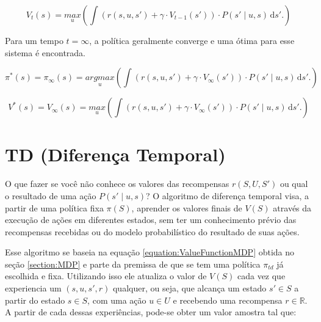 \begin{equation}
    V_t \left( s \right) = \underset{u}{max} \left( \int \! \left( r \left( s, u, s' \right) + \gamma \cdot V_{t-1} \left( s' \right) \right) \cdot P \left( s' \mid u, s \right) \, \mathrm{d}s'. \right)
\end{equation}

Para um tempo $ t = \infty $, a política geralmente converge e uma ótima para esse sistema é encontrada.

\begin{equation}
    \pi^* \left( s \right) = \pi_\infty \left( s \right) = \underset{u}{argmax} \left( \int \! \left( r \left( s, u, s' \right) + \gamma \cdot V_\infty \left( s' \right) \right) \cdot P \left( s' \mid u, s \right) \, \mathrm{d}s'. \right)
\end{equation}

\begin{equation} \label{equation:ValueFunctionMDP}
    V^* \left( s \right) = V_\infty \left( s \right) = \underset{u}{max} \left( \int \! \left( r \left( s, u, s' \right) + \gamma \cdot V_\infty \left( s' \right) \right) \cdot P \left( s' \mid u, s \right) \, \mathrm{d}s'. \right)
\end{equation}


\section{TD (Diferença Temporal)} \label{section:TD}

O que fazer se você não conhece os valores das recompensas $ r \left( S, U, S' \right) $ ou qual o resultado de uma ação $ P \left( s' \mid u, s \right) $? O algoritmo de diferença temporal visa, a partir de uma política fixa $ \pi \left( S \right) $, aprender os valores finais de $ V \left( S \right) $ através da execução de ações em diferentes estados, sem ter um conhecimento prévio das recompensas recebidas ou do modelo probabilístico do resultado de suas ações.

Esse algoritmo se baseia na equação \ref{equation:ValueFunctionMDP} obtida no seção \ref{section:MDP} e parte da premissa de que se tem uma política $ \pi_{td} $ já escolhida e fixa. Utilizando isso ele atualiza o valor de $ V \left( S \right) $ cada vez que experiencia um $ \left( s, u, s', r \right) $ qualquer, ou seja, que alcança um estado $ s' \in S $ a partir do estado $ s \in S $, com uma ação $ u \in U $ e recebendo uma recompensa $ r \in \mathbb{R} $. A partir de cada dessas experiências, pode-se obter um valor amostra tal que:

